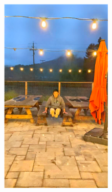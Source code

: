 \documentclass[letterpaper,12pt]{article}
\begin{document}
\begin{figure}[htbp]
\begin{subfigure}{0.128\textwidth}
			\includegraphics[width=\linewidth]{LoLi-Phone-imgT_1/EnlightenGAN}
			\captionsetup{font=scriptsize}
			\caption{}
			\label{fig: LoLi-Phone-imgT_1_j}  
		\end{subfigure}
		\begin{subfigure}{0.128\textwidth}

\end{subfigure}
\end{figure}
\end{document}
